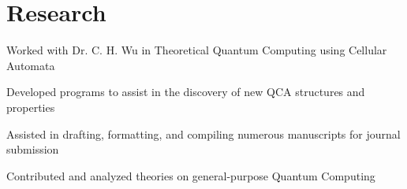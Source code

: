 \documentclass[]{deedy-resume-reversed}
\begin{document}
\begin{minipage}[t]{0.66\textwidth}
\section{Research}
\begin{tightemize}
	\item Worked with Dr. C. H. Wu in Theoretical Quantum Computing using Cellular Automata
	\item Developed programs to assist in the discovery of new QCA structures and properties
	\item Assisted in drafting, formatting, and compiling numerous manuscripts for journal submission
	\item Contributed and analyzed theories on general-purpose Quantum Computing
\end{tightemize}
	



\end{minipage} 
\end{document}
